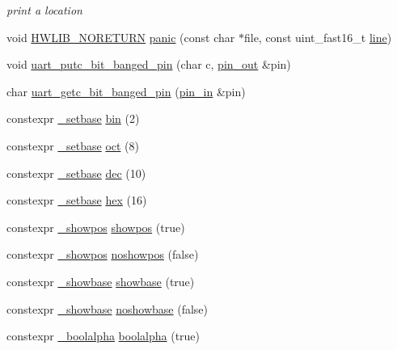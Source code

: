 \begin{DoxyCompactItemize}
\begin{DoxyCompactList}\small\item\em print a location \end{DoxyCompactList}\item 
void \hyperlink{hwlib-defines_8hpp_aef311f1f416fdcbd1fa22376dcc01029}{H\+W\+L\+I\+B\+\_\+\+N\+O\+R\+E\+T\+U\+RN} \hyperlink{namespacehwlib_a80caa11d8c2b6dd8d5a6655273e3c7d3}{panic} (const char $\ast$file, const uint\+\_\+fast16\+\_\+t \hyperlink{classhwlib_1_1line}{line})
\item 
void \hyperlink{namespacehwlib_a68a0d1b033eb1a830df4b2cbdd7ff281}{uart\+\_\+putc\+\_\+bit\+\_\+banged\+\_\+pin} (char c, \hyperlink{classhwlib_1_1pin__out}{pin\+\_\+out} \&pin)
\item 
char \hyperlink{namespacehwlib_a9e4a38353bdbb18425459cddb55b185e}{uart\+\_\+getc\+\_\+bit\+\_\+banged\+\_\+pin} (\hyperlink{classhwlib_1_1pin__in}{pin\+\_\+in} \&pin)
\item 
constexpr \hyperlink{structhwlib_1_1__setbase}{\+\_\+setbase} \hyperlink{namespacehwlib_a2f624a643c9c8d30b5e4f3dca914e28e}{bin} (2)
\item 
constexpr \hyperlink{structhwlib_1_1__setbase}{\+\_\+setbase} \hyperlink{namespacehwlib_a9711974fb746e16a55e130b461cad619}{oct} (8)
\item 
constexpr \hyperlink{structhwlib_1_1__setbase}{\+\_\+setbase} \hyperlink{namespacehwlib_ab8f3a2357c88d53861c09dbd17f14f1b}{dec} (10)
\item 
constexpr \hyperlink{structhwlib_1_1__setbase}{\+\_\+setbase} \hyperlink{namespacehwlib_a4726c8f4bef5591b6f6853041328a04f}{hex} (16)
\item 
constexpr \hyperlink{structhwlib_1_1__showpos}{\+\_\+showpos} \hyperlink{namespacehwlib_a7bb9927f52011b4cc4a90b03e98f95fd}{showpos} (true)
\item 
constexpr \hyperlink{structhwlib_1_1__showpos}{\+\_\+showpos} \hyperlink{namespacehwlib_accdd72e1358d667a9458767d886b2a53}{noshowpos} (false)
\item 
constexpr \hyperlink{structhwlib_1_1__showbase}{\+\_\+showbase} \hyperlink{namespacehwlib_a84adb21b2d054d3b70c6b26af5f44566}{showbase} (true)
\item 
constexpr \hyperlink{structhwlib_1_1__showbase}{\+\_\+showbase} \hyperlink{namespacehwlib_af813ae25dc70ae85e2f06dcf81f8963b}{noshowbase} (false)
\item 
constexpr \hyperlink{structhwlib_1_1__boolalpha}{\+\_\+boolalpha} \hyperlink{namespacehwlib_a499e8cd6806e66c4c425b64c9512a21c}{boolalpha} (true)

\end{DoxyCompactItemize}
